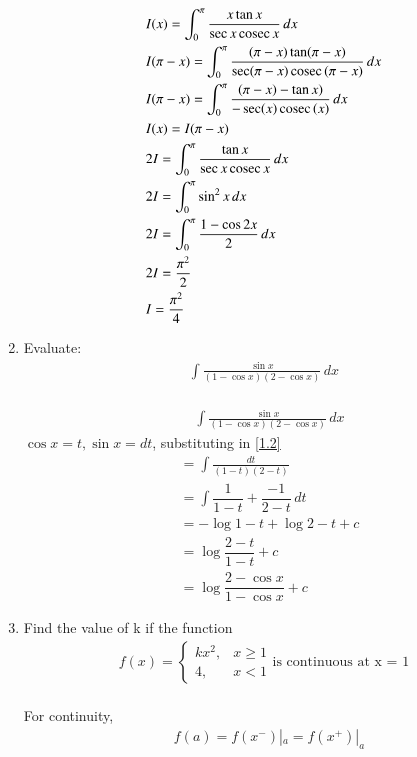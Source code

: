 \documentclass[journal,12pt,twocolumn]{IEEEtran}
\renewcommand\thesection{\arabic{section}}
\begin{document}
\begin{enumerate}[label=\thesection.\arabic*.,ref=\thesection.\theenumi]
\solution\\
\begin{align}
&I(x) = \int_{0}^{\pi} \displaystyle\frac{x\tan x}{\sec x\,\text{cosec}\, x}\, dx \\
&I(\pi - x) =  \int_{0}^{\pi} \displaystyle\frac{(\pi - x )\tan (\pi-x)}{\sec (\pi-x)\,\text{cosec}\,(\pi- x)}\, dx \\
&I(\pi - x) =  \int_{0}^{\pi} \displaystyle\frac{(\pi - x ) - \tan x)}{ - \sec (x)\,\text{cosec}\,(x)}\, dx \\
&I(x) = I(\pi - x)\\
&2I = \int_{0}^{\pi} \displaystyle\frac{\tan x}{\sec x\,\text{cosec}\, x}\, dx \\
&2I = \int_{0}^{\pi} \sin^2x\, dx \\
&2I = \int_{0}^{\pi} \displaystyle\frac{1-\cos2x}{2}\, dx \\
& 2I= \displaystyle\frac{\pi^2}{2}\\
& I = \displaystyle\frac{\pi^2}{4}
\end{align}
\item Evaluate: 
\begin{align}
    \int \displaystyle\frac{\sin x}{(1-\cos x)(2-\cos x)}\, dx \nonumber
    \end{align}
 \solution \\
 \begin{align}
 & \int \displaystyle\frac{\sin x}{(1-\cos x)(2-\cos x)}\, dx  \label{1.2}
 \end{align}
$ \cos x =t , \sin x=dt$, substituting in \eqref{1.2}
\begin{align}
&=\int \displaystyle\frac{dt}{(1-t)(2-t)} \\
&= \int \dfrac{1}{1-t}+\dfrac{-1}{2-t}\, dt \\
&= -\log{1-t}+\log{2-t} +c\\
&= \log{\dfrac{2-t}{1-t}} +c\\
&= \log{\dfrac{2-\cos x}{1-\cos x}} +c
\end{align}
\item Find the value of k if the function
\begin{align}
    f(x) =
   \left\{
\begin{array}{ll}
      kx^2, & x\geq 1 \\
      4, & x <  1 
\end{array} \right. 
\text{is continuous at x = 1} \nonumber
\end{align}
\solution \\
For continuity,
\begin{align}
& f(a) = f(x^-)|_a =  f(x^+)|_a  \label{1.3}\\

\end{align}
\end{enumerate}
\end{document}
